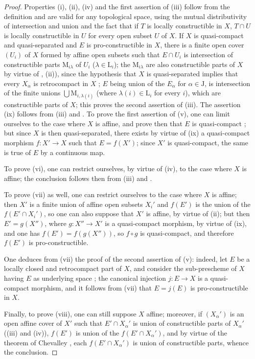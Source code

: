 \begin{proof}
Properties (i), (ii), (iv) and the first assertion of (iii) follow from the definition  and are valid for any topological space, using the mutual distributivity of intersection and union and the fact that if $T$ is locally constructible in $X$, $T\cap U$ is locally constructible in $U$ for every open subset $U$ of $X$.
If $X$ is quasi-compact and quasi-separated and $E$ is pro-constructible in $X$, there is a finite open cover $(U_i)$ of $X$ formed by affine open subsets such that $E\cap U_i$ is intersection of constructible parts $\mathrm{M}_{i\lambda}$ of $U_i$ ($\lambda\in\mathrm{L}_i$); the $\mathrm{M}_{i\lambda}$ are also constructible parts of $X$ by virtue of , (ii)), since the hypothesis that $X$ is quasi-separated implies that every $X_\alpha$ is retrocompact in $X$ ; $E$ being union of the $E_\alpha$ for $\alpha\in\mathrm{J}$, is intersection of the finite unions $\bigcup \mathrm{M}_{i,\lambda(i)}$ (where $\lambda(i)\in\mathrm{L}_i$ for every $i$), which are constructible parts of $X$; this proves the second assertion of (iii).
The assertion (ix) follows from (iii) and .
To prove the first assertion of (v), one can limit ourselves to the case where $X$ is affine, and prove then that $E$ is quasi-compact ; but since $X$ is then quasi-separated, there exists by virtue of (ix) a quasi-compact morphism $f:X'\to X$ such that $E=f(X')$; since $X'$ is quasi-compact, the same is true of $E$ by a continuous map.

To prove (vi), one can restrict ourselves, by virtue of (iv), to the case where $X$ is affine; the conclusion follows then from (iii) and .

To prove (vii) as well, one can restrict ourselves to the case where $X$ is affine; then $X'$ is a finite union of affine open subsets $X_i'$ and $f(E')$ is the union of the $f(E'\cap X_i')$, so one can also suppose that $X'$ is affine, by virtue of (ii); but then $E'=g(X'')$, where $g:X''\to X'$ is a quasi-compact morphism, by virtue of (ix), and one has $f(E')=f(g(X''))$, so $f\circ g$ is quasi-compact, and therefore $f(E')$ is pro-constructible.

One deduces from (vii) the proof of the second assertion of (v): indeed, let $E$ be a locally closed and retrocompact part of $X$, and consider the sub-prescheme of $X$ having $E$ as underlying space ; the canonical injection $j:E\to X$ is a quasi-compact morphism, and it follows from (vii) that $E=j(E)$ is pro-constructible in $X$.

Finally, to prove (viii), one can still suppose $X$ affine; moreover, if $(X_\alpha')$ is an open affine cover of $X'$ such that $E'\cap X_\alpha'$ is union of constructible parts of $X_\alpha'$ ((iii) and (iv)), $f(E')$ is union of the $f(E'\cap X_\alpha')$, and by virtue of the theorem of Chevalley , each $f(E'\cap X_\alpha')$ is union of constructible parts, whence the conclusion.
\end{proof}

